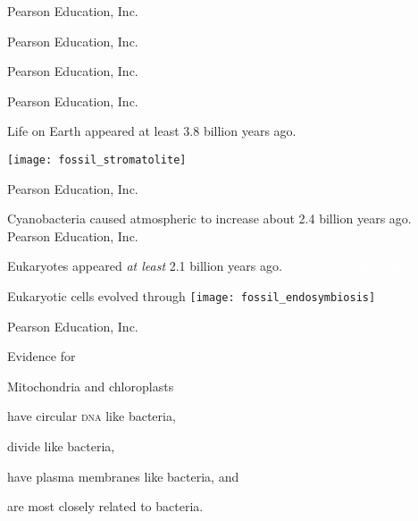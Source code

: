 \documentclass[t]{beamer}
\begin{document}
%
{
\begin{frame}[b]
\hfill \tiny \textcopyright Pearson Education, Inc.
\end{frame}
}
%
{
\begin{frame}[b]
\hfill \tiny \textcopyright Pearson Education, Inc.
\end{frame}
}
%
{
\begin{frame}[b]
\hfill \tiny \textcopyright Pearson Education, Inc.
\end{frame}
}
%
{
\begin{frame}[b]
\hfill \tiny \textcopyright Pearson Education, Inc.
\end{frame}
}
%
\begin{frame}[t]{Life on Earth appeared at least 3.8 billion years ago.}

	\texttt{[image: fossil\_stromatolite]}
	
	\vfilll
	
	\hfill \tiny \textcopyright Pearson Education, Inc.
\end{frame}

{
\begin{frame}[b]{Cyanobacteria caused atmospheric  to increase about 2.4 billion years ago.}
\tiny \textcopyright Pearson Education, Inc.
\end{frame}
}
%
{
\begin{frame}[b]{Eukaryotes appeared \emph{at least} 2.1 billion years ago.}
\tiny \textcolor{white}{Xvazquez, Wikimedia, }
\end{frame}
}
%
\begin{frame}[t]{Eukaryotic cells evolved through }
	\texttt{[image: fossil\_endosymbiosis]}
	
	\vfilll
	
	\hfill \tiny \textcopyright Pearson Education, Inc.
\end{frame}

\begin{frame}[t]{Evidence for  }

	\hangpara Mitochondria and chloroplasts
	
	\hangpara \hspace*{1em} have circular \textsc{dna} like bacteria,
	
	\hangpara \hspace*{1em} divide like bacteria,
	
	\hangpara \hspace*{1em} have plasma membranes like bacteria, and
	
	\hangpara \hspace*{1em} are most closely related to bacteria.
	
\end{frame}
\end{document}
